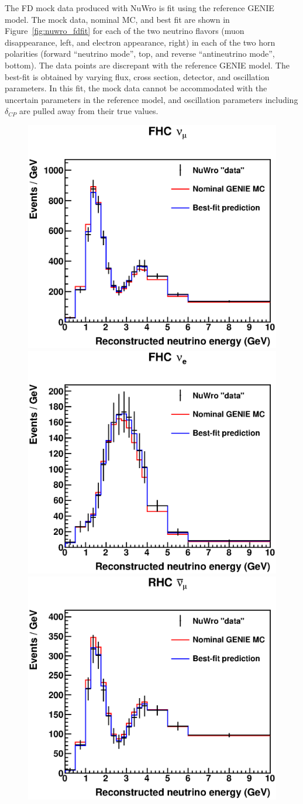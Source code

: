 \documentclass[11pt]{article}
\begin{document}
The FD mock data produced with NuWro is fit using the reference GENIE model. The mock data, nominal MC, and best fit are shown in Figure~\ref{fig:nuwro_fdfit} for each of the two neutrino flavors (muon disappearance, left, and electron appearance, right) in each of the two horn polarities (forward ``neutrino mode'', top, and reverse ``antineutrino mode'', bottom). The data points are discrepant with the reference GENIE model. The best-fit is obtained by varying flux, cross section, detector, and oscillation parameters. In this fit, the mock data cannot be accommodated with the uncertain parameters in the reference model, and oscillation parameters including $\delta_{CP}$ are pulled away from their true values.

\begin{figure}[h]
\centering
\includegraphics[width=0.45\columnwidth]{graphics/bf_dcp0_NumuFhc.eps}
\includegraphics[width=0.45\columnwidth]{graphics/bf_dcp0_NueFhc.eps} \\
\includegraphics[width=0.45\columnwidth]{graphics/bf_dcp0_NumuRhc.eps}

\end{figure}
\end{document}
